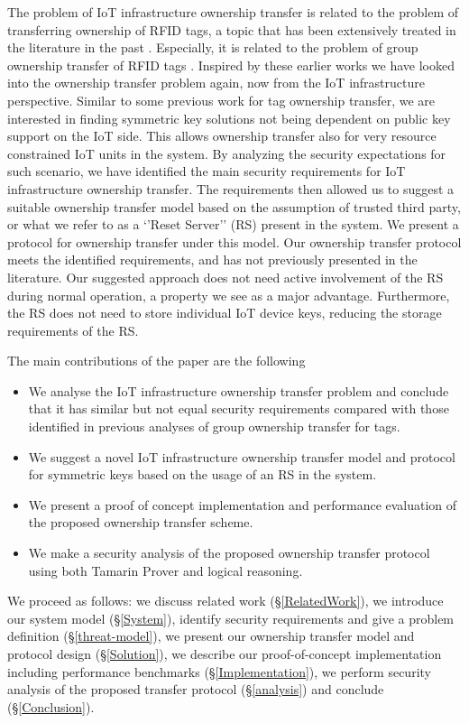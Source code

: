 {The problem of IoT infrastructure ownership transfer is related to the problem of transferring ownership of RFID tags, a topic that has been extensively treated in the literature in the past \cite{taqieddin2018tag}. Especially, it is related to the problem of group ownership transfer of RFID tags \cite{zuo2010changing}\cite{kapoor2011multi}\cite{He2014}. Inspired by these earlier works we have looked into the ownership transfer problem again, now from the IoT infrastructure perspective.  Similar to some previous work for tag ownership transfer, we are interested in finding symmetric key solutions not being dependent on public key support on the IoT side. This allows ownership transfer also for very resource constrained IoT units in the system\cite{Eisenbarth2007}. By analyzing the security expectations for such scenario, we have identified the main security requirements for IoT infrastructure ownership transfer. The requirements then allowed us to suggest a suitable ownership transfer model based on the assumption of trusted third party, or what we refer to as a ‘’Reset Server’’ (RS) present in the system. We present a protocol for ownership transfer under this model. 
Our ownership transfer protocol meets the identified requirements, and has not previously presented in the literature. Our suggested approach does not need active involvement of the RS during normal operation, a property we see as a major advantage. Furthermore, the RS does not need to store individual IoT device keys, reducing the storage requirements of the RS.

The main contributions of the paper are the following
\begin{itemize}
    \item We analyse the IoT infrastructure ownership transfer problem and conclude that it has similar but not equal security requirements compared with those identified in previous analyses of group ownership transfer for tags.
    \item We suggest a novel IoT infrastructure ownership transfer model and protocol for symmetric keys based on the usage of an RS in the system.
    \item We present a proof of concept implementation and performance evaluation of the proposed ownership transfer scheme.
    \item We make a security analysis of the proposed ownership transfer protocol using both Tamarin Prover and logical reasoning.
\end{itemize}

We proceed as follows: we discuss related work (\S \ref{RelatedWork}), we introduce our system model (\S \ref{System}), identify security requirements and give a problem definition (\S \ref{threat-model}), we present our ownership transfer model and protocol design (\S \ref{Solution}), we describe our proof-of-concept implementation including performance benchmarks (\S \ref{Implementation}), we perform  security analysis of the proposed transfer protocol (\S \ref{analysis}) and conclude (\S \ref{Conclusion}).

}
